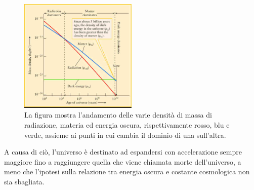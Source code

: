 \begin{figure}
    \centering
    \includegraphics[width = 0.5\textwidth]{immagini/epoche-universo.jpg}
    \caption{La figura mostra l'andamento delle varie densità di massa di radiazione, materia ed energia oscura, rispettivamente rosso, blu e verde, assieme ai punti in cui cambia il dominio di una sull'altra.}\label{fig:epoche}
\end{figure}

A causa di ciò, l'universo è destinato ad espandersi con accelerazione sempre maggiore fino a raggiungere quella che viene chiamata morte dell'universo, a meno che l'ipotesi sulla relazione tra energia oscura e costante cosmologica non sia sbagliata.